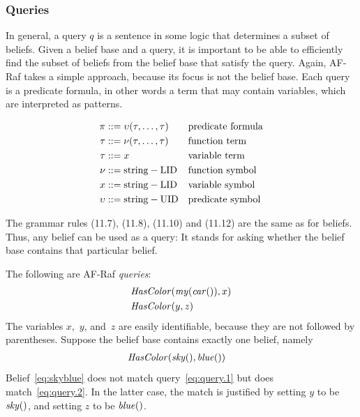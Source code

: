 \documentclass[a4paper,12pt,oneside,fleqn]{book} %
\begin{document}
{\subsubsection{Queries}

In general, a query $q$ is a sentence in some logic that determines a
subset of beliefs.  Given a belief base and a query, it is important to be
able to efficiently find the subset of beliefs from the belief base that
satisfy the query.  Again, AF-Raf takes a simple approach, because its
focus is not the belief base.  Each query is a predicate formula, in other
words a term that may contain variables, which are interpreted as patterns.

\begin{align} \pi &::=
\upsilon(\tau,\ldots,\tau) && \text{predicate formula} \\\tau &::=
\nu(\tau,\ldots,\tau) && \text{function term} \\ \tau &::= x &&
\text{variable term} \\ \nu  &::= {\rm string-LID} &&\text{function symbol} \\
x &::= {\rm string-LID} && \text{variable symbol} \\ \upsilon  &::= {\rm
string-UID} &&\text{predicate symbol} \end{align} 

The grammar rules (11.7), (11.8), (11.10) and (11.12) are the same as for
beliefs.  Thus, any belief can be used as a query:  It stands for asking
whether the belief base contains that particular belief.

\begin{example} The following are AF-Raf \emph{queries}: \begin{align}
&{\it HasColor}({\it my}({\it car}()), x) \label{eq:query.1} \\ &{\it
HasColor}(y, z) \label{eq:query.2} \end{align} The variables $x$,~$y$,
and~$z$ are easily identifiable, because they are not followed by
parentheses.  Suppose the belief base contains exactly one belief, namely
\begin{align} &{\it HasColor}({\it sky}(), {\it blue}()) \label{eq:skyblue}
\end{align} Belief~\eqref{eq:skyblue} does not match
query~\eqref{eq:query.1} but does match~\eqref{eq:query.2}.  In the latter
case, the match is justified by setting $y$ to be ${\it sky}()$, and
setting $z$ to be ${\it blue}()$.
\end{example}

}
\end{document}
